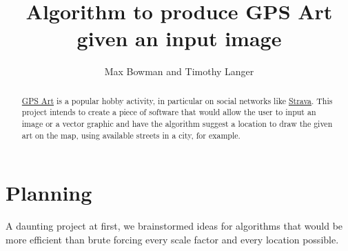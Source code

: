 \documentclass[11pt,twoside,a4paper]{article}
\author{Max Bowman and Timothy Langer}
\title{Algorithm to produce GPS Art given an input image}
\begin{document}
\maketitle

\begin{abstract}
  \href{https://en.wikipedia.org/wiki/GPS_drawing}{GPS Art} is a popular hobby activity, in particular on social networks like \href{https://strava.com}{Strava}. This project intends to create a piece of software that would allow the user to input an image or a vector graphic and have the algorithm suggest a location to draw the given art on the map, using available streets in a city, for example.
\end{abstract}

\section{Planning}

A daunting project at first, we brainstormed ideas for algorithms that would be more efficient than brute forcing every scale factor and every location possible.
\end{document}
